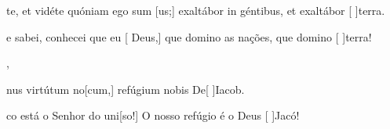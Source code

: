 {  {\item {}te, et vidéte quóniam ego sum [us;] exaltábor in géntibus, et exaltábor [ ]{ter}ra.}%
    {\item {} e sabei, conhecei que eu [ Deus,] que domino as nações, que domino [ ]{ter}ra!},
  {\item {}nus virtútum no[cum,] refúgium nobis De\-[ ]{Ia}cob.}%
    {\item {}co está o Senhor do uni[so!] O nosso refúgio é o Deus [ ]{Ja}có!}
}